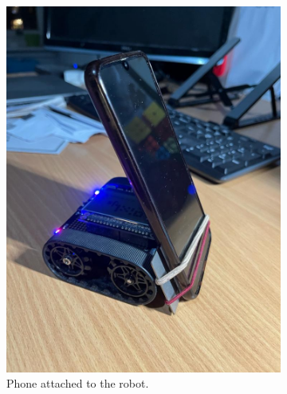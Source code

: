\documentclass{l4proj}
\begin{document}
\begin{figure}[!ht]
    \centering
    \begin{subfigure}{0.40\textwidth}
        \includegraphics[width=\textwidth]{images/phone-attachment-2.jpeg}
        \caption{Phone attached to the robot.}
        \label{fig:phone-attach}
    \end{subfigure}
    \begin{subfigure}{0.40\textwidth}

\end{subfigure}
\end{figure}
\end{document}
